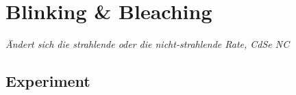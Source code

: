 

\chapter{Blinking \& Bleaching}



\textit{Ändert sich die strahlende oder die nicht-strahlende Rate, CdSe NC
}
\section{Experiment}

 


\printbibliography[segment=\therefsegment,heading=subbibliography]

